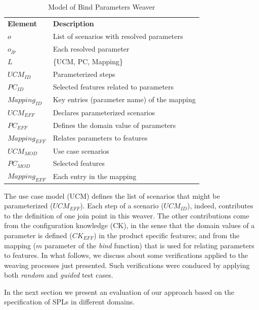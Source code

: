 \documentclass{acm_proc_article-sp}
\begin{document}
\begin{table}[th]
\begin{center}
\caption{Model of Bind Parameters Weaver} \label{tab:bp-weaver}
\begin{tabular}{p{0.7in}p{2.3in}}
   \hline\noalign{\smallskip}
  {\bf Element} & {\bf Description} \\
   \noalign{\smallskip}
   \hline
   \noalign{\smallskip}
   $o$               & List of scenarios with resolved parameters  \\
   $o_{jp}$        & Each resolved parameter \\
   $L$               & \{UCM, PC, Mapping\} \\
   $UCM_{ID}$ & Parameterized steps \\
   $PC_{ID}$    & Selected features related to parameters \\
   $Mapping_{ID}$ & Key entries (parameter name) of the mapping\\
   $UCM_{EFF}$ & Declares parameterized scenarios \\
   $PC_{EFF}$    & Defines the domain value of parameters \\
   $Mapping_{EFF}$ & Relates parameters to features \\
   $UCM_{MOD}$ & Use case scenarios \\
   $PC_{MOD}$    & Selected features \\
   $Mapping_{EFF}$ & Each entry in the mapping \\
  \hline
  \end{tabular}
\end{center}
\end{table}

The use case model (UCM) defines the list of scenarios that might be
parameterized ($UCM_{EFF}$). Each step of a scenario ($UCM_{ID}$), indeed,
contributes to the definition of one join point in this weaver. The other
contributions come from the configuration knowledge (CK), in the sense that the
domain values of a parameter is defined ($CK_{EFF}$) in the product specific
features; and from the mapping ($m$ parameter of the \emph{bind} function) that
is used for relating parameters to features. In what follows, we discuss about
some verifications applied to the weaving processes just presented. Such
verifications were conduced by applying both \emph{random} and \emph{guided} test
cases.


In the next section we present an evaluation of our approach based on the
specification of SPLs in different domains.
\end{document}
